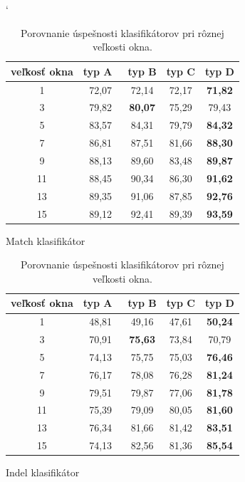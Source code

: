 \begin{table}[htp]
\catcode`
\centering
\begin{subtable}{\textwidth}
\centering
\begin{tabular}{ccccc}
\toprule
veľkosť okna & typ A~& typ B & typ C & typ D\\
\midrule
1 &  72,07 & 72,14 & 72,17 & \textbf{71,82}\\
3 &  79,82 & \textbf{80,07} & 75,29 & 79,43\\
5 &  83,57 & 84,31 & 79,79 & \textbf{84,32}\\
7 &  86,81 & 87,51 & 81,66 & \textbf{88,30}\\
9 &  88,13 & 89,60 & 83,48 & \textbf{89,87}\\
11 & 88,45 & 90,34 & 86,30 & \textbf{91,62}\\
13 & 89,35 & 91,06 & 87,85 & \textbf{92,76}\\
15 & 89,12 & 92,41 & 89,39 & \textbf{93,59}\\
\bottomrule
\end{tabular}
\caption{Match klasifikátor}
\end{subtable}

\vspace{1cm}

\begin{subtable}{\textwidth}
\centering
\begin{tabular}{ccccc}
\toprule
veľkosť okna & typ A~& typ B & typ C & typ D\\
\midrule
1 &  48,81 & 49,16 & 47,61 & \textbf{50,24}\\
3 &  70,91 & \textbf{75,63} & 73,84 & 70,79\\
5 &  74,13 & 75,75 & 75,03 & \textbf{76,46}\\
7 &  76,17 & 78,08 & 76,28 & \textbf{81,24}\\
9 &  79,51 & 79,87 & 77,06 & \textbf{81,78}\\
11 & 75,39 & 79,09 & 80,05 & \textbf{81,60}\\
13 & 76,34 & 81,66 & 81,42 & \textbf{83,51}\\
15 & 74,13 & 82,56 & 81,36 & \textbf{85,54}\\
\bottomrule
\end{tabular}
\caption{Indel klasifikátor}
\end{subtable}
\caption[Porovnanie úspešnosti klasifikátorov pri rôznej veľkosti okna]{Porovnanie úspešnosti klasifikátorov pri rôznej veľkosti okna.}
\label{tab:clf-window-results}
\end{table}

